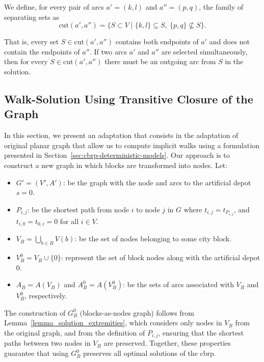 We define, for every pair of arcs $a' = (k, l)$ and $a'' = (p, q)$, the family
of separating sets as
\[
	\mathrm{cut}(a', a'') = \{ S \subset V \mid \{k, l\} \subseteq S, \ \{p, q\} \nsubseteq S \}.
\]

That is, every set $S \in \mathrm{cut}(a', a'')$ contains both endpoints of $a'$
and does not contain the endpoints of $a''$. If two arcs $a'$ and $a''$ are
selected simultaneously, then for every $S \in \mathrm{cut}(a', a'')$ there must
be an outgoing arc from $S$ in the solution.

\subsection{Walk-Solution Using Transitive Closure of the Graph}\label{sec:walk-solution-using-transitive-closure}

In this section, we present an adaptation that consists in the adaptation of
original planar graph that allow us to compute implicit walks using a
formulation presented in Section~\ref{sec:cbrp-deterministic-models}. Our
approach is to construct a new graph in which blocks are transformed into nodes.
Let:

\begin{itemize}
	\item $G' = (V', A')$: be the graph with the node and arcs to the artificial
	      depot $s = 0$.
	\item $P_{i,j}$: be the shortest path from node $i$ to node $j$ in $G$ where
	      $t_{i,j} = t_{P_{i,j}}$, and $t_{i,0} = t_{0,i} = 0$ for all $i \in
		      V$.
	\item $V_B = \bigcup_{b \in B} V(b)$: be the set of nodes belonging to some
	      city block.
	\item $V_B^0 = V_B \cup \{0\}$: represent the set of block nodes along with
	      the artificial depot $0$.
	\item $A_B = A(V_B)$ and $A_B^0 = A(V_B^0)$: be the sets of arcs associated
	      with $V_B$ and $V_B^0$, respectively.
\end{itemize}


The construction of $G_B^0$ (blocks-as-nodes graph) follows from
Lemma~\ref{lemma_solution_extremities}, which considers only nodes in $V_B$ from
the original graph, and from the definition of $P_{i,j}$, ensuring that the
shortest paths between two nodes in $V_B$ are preserved. Together, these
properties guarantee that using $G_B^0$ preserves all optimal solutions of the
\gls{cbrp}.

